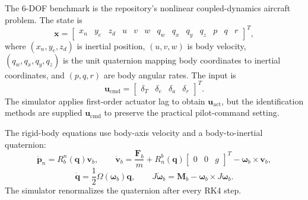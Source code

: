 \documentclass[11pt]{article}
\begin{document}
The 6-DOF benchmark is the repository's nonlinear coupled-dynamics aircraft problem. The state is
\[
\mathbf{x}=
\begin{bmatrix}
x_n & y_e & z_d & u & v & w & q_w & q_x & q_y & q_z & p & q & r
\end{bmatrix}^T,
\]
where $(x_n,y_e,z_d)$ is inertial position, $(u,v,w)$ is body velocity, $(q_w,q_x,q_y,q_z)$ is the unit quaternion mapping body coordinates to inertial coordinates, and $(p,q,r)$ are body angular rates. The input is
\[
\mathbf{u}_{\mathrm{cmd}}=
\begin{bmatrix}
\delta_T & \delta_e & \delta_a & \delta_r
\end{bmatrix}^T.
\]
The simulator applies first-order actuator lag to obtain $\mathbf{u}_{\mathrm{act}}$, but the identification methods are supplied $\mathbf{u}_{\mathrm{cmd}}$ to preserve the practical pilot-command setting.

The rigid-body equations use body-axis velocity and a body-to-inertial quaternion:
\[
\dot{\mathbf{p}}_n = R_{b}^{n}(\mathbf{q})\mathbf{v}_b,\qquad
\dot{\mathbf{v}}_b = \frac{\mathbf{F}_b}{m} + R_{n}^{b}(\mathbf{q})\begin{bmatrix}0&0&g\end{bmatrix}^T - \boldsymbol{\omega}_b\times\mathbf{v}_b,
\]
\[
\dot{\mathbf{q}} = \frac{1}{2}\Omega(\boldsymbol{\omega}_b)\mathbf{q},\qquad
J\dot{\boldsymbol{\omega}}_b = \mathbf{M}_b - \boldsymbol{\omega}_b\times J\boldsymbol{\omega}_b.
\]
The simulator renormalizes the quaternion after every RK4 step.
\end{document}
